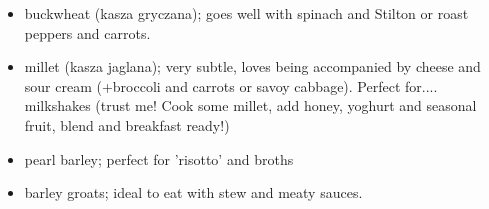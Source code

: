 \documentclass[12pt,a4paper]{article}
\begin{document}
	\begin{itemize}
		\setlength\itemsep{0.1mm}
		\item buckwheat (kasza gryczana); goes well with spinach and Stilton or roast peppers and carrots. 
		\item millet (kasza jaglana); very subtle, loves being accompanied by cheese and sour cream (+broccoli and carrots or savoy cabbage). Perfect for.... milkshakes (trust me! Cook some millet, add honey, yoghurt and seasonal fruit, blend and breakfast ready!) 
		\item pearl barley; perfect for 'risotto' and broths
		\item barley groats; ideal to eat with stew and meaty sauces. 
	\end{itemize}
	
	
\end{document}
